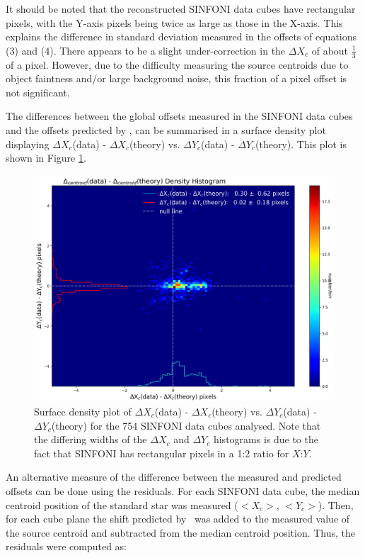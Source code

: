 It should be noted that the reconstructed SINFONI data cubes have rectangular pixels, with the Y-axis pixels being twice as large as those in the X-axis.  This
explains the difference in standard deviation measured in the offsets of equations (3) and (4). 
There appears to be a slight under-correction in the $\Delta X_c$ of about $\frac{1}{3}$ of a pixel.  However, due to the difficulty measuring the source centroids
due to object faintness and/or large background noise, this fraction of a pixel offset is not significant.

The differences between the global offsets measured in the SINFONI data cubes and the offsets predicted by \hdrldar, can be summarised in a surface density
plot displaying $\Delta X_c$(data) - $\Delta X_c$(theory) vs. $\Delta Y_c$(data) - $\Delta Y_c$(theory).   This plot is shown in Figure \ref{fig:surface_density}.


\begin{figure}[H]
\centering \subfigure
\includegraphics[width=15cm]{figures/SINFO_DAR_2014_2015_2016_surface_density.png} 
\caption[]
	{\footnotesize  Surface density plot of $\Delta X_c$(data) - $\Delta X_c$(theory) vs. $\Delta Y_c$(data) - $\Delta Y_c$(theory) for the 754 SINFONI data
	cubes analysed.  Note that the differing widths of the $\Delta X_c$ and $\Delta Y_c$ histograms is due to the fact that SINFONI has rectangular pixels
	in a 1:2 ratio for $X$:$Y$.
	}
	\label{fig:surface_density}
\end{figure}


An alternative measure of the difference between the measured and predicted offsets can be done using the residuals.  For each SINFONI data cube,
the median centroid position of the standard star was measured ($<X_c>$, $<Y_c>$).  Then, for each cube plane the shift predicted by \hdrldar\ was
added to the measured value of the source centroid and subtracted from the median centroid position.   Thus, the residuals were computed as:

